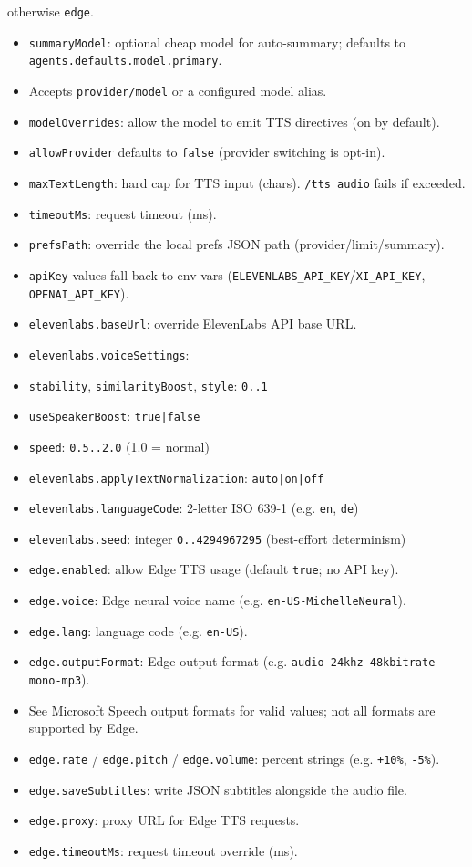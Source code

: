otherwise \texttt{edge}.
\begin{itemize}
  \item \texttt{summaryModel}: optional cheap model for auto-summary; defaults to \texttt{agents.defaults.model.primary}.
  \item Accepts \texttt{provider/model} or a configured model alias.
  \item \texttt{modelOverrides}: allow the model to emit TTS directives (on by default).
  \item \texttt{allowProvider} defaults to \texttt{false} (provider switching is opt-in).
  \item \texttt{maxTextLength}: hard cap for TTS input (chars). \texttt{/tts audio} fails if exceeded.
  \item \texttt{timeoutMs}: request timeout (ms).
  \item \texttt{prefsPath}: override the local prefs JSON path (provider/limit/summary).
  \item \texttt{apiKey} values fall back to env vars (\texttt{ELEVENLABS\_API\_KEY}/\texttt{XI\_API\_KEY}, \texttt{OPENAI\_API\_KEY}).
  \item \texttt{elevenlabs.baseUrl}: override ElevenLabs API base URL.
  \item \texttt{elevenlabs.voiceSettings}:
  \item \texttt{stability}, \texttt{similarityBoost}, \texttt{style}: \texttt{0..1}
  \item \texttt{useSpeakerBoost}: \texttt{true|false}
  \item \texttt{speed}: \texttt{0.5..2.0} (1.0 = normal)
  \item \texttt{elevenlabs.applyTextNormalization}: \texttt{auto|on|off}
  \item \texttt{elevenlabs.languageCode}: 2-letter ISO 639-1 (e.g. \texttt{en}, \texttt{de})
  \item \texttt{elevenlabs.seed}: integer \texttt{0..4294967295} (best-effort determinism)
  \item \texttt{edge.enabled}: allow Edge TTS usage (default \texttt{true}; no API key).
  \item \texttt{edge.voice}: Edge neural voice name (e.g. \texttt{en-US-MichelleNeural}).
  \item \texttt{edge.lang}: language code (e.g. \texttt{en-US}).
  \item \texttt{edge.outputFormat}: Edge output format (e.g. \texttt{audio-24khz-48kbitrate-mono-mp3}).
  \item See Microsoft Speech output formats for valid values; not all formats are supported by Edge.
  \item \texttt{edge.rate} / \texttt{edge.pitch} / \texttt{edge.volume}: percent strings (e.g. \texttt{+10\%}, \texttt{-5\%}).
  \item \texttt{edge.saveSubtitles}: write JSON subtitles alongside the audio file.
  \item \texttt{edge.proxy}: proxy URL for Edge TTS requests.
  \item \texttt{edge.timeoutMs}: request timeout override (ms).
\end{itemize}


